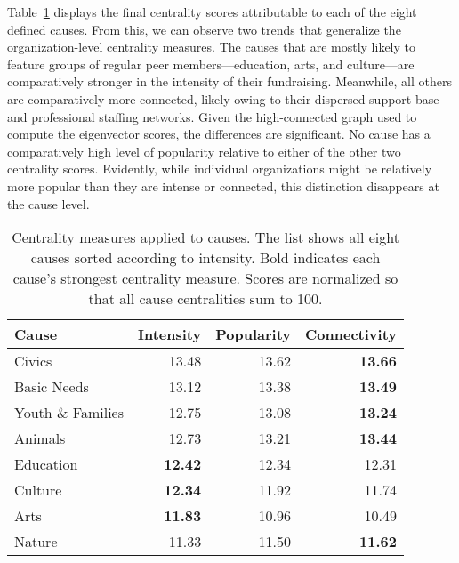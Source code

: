 Table~\ref{tab:cause} displays the final centrality scores attributable to each of the eight defined causes.
From this, we can observe two trends that generalize the organization-level centrality measures.
The causes that are mostly likely to feature groups of regular peer members---education, arts, and culture---are comparatively stronger in the intensity of their fundraising.
Meanwhile, all others are comparatively more connected, likely owing to their dispersed support base and professional staffing networks.
Given the high-connected graph used to compute the eigenvector scores, the differences are significant.
No cause has a comparatively high level of popularity relative to either of the other two centrality scores.
Evidently, while individual organizations might be relatively more popular than they are intense or connected, this distinction disappears at the cause level.

\begin{table}[H]
  \caption{Centrality measures applied to causes. The list shows all eight causes sorted according to intensity. Bold indicates each cause's strongest centrality measure. Scores are normalized so that all cause centralities sum to 100.}
  \label{tab:cause}
  \begin{tabular*}{\linewidth}{l@{\extracolsep{\fill}}rrr}
    \toprule
    Cause & Intensity & Popularity & Connectivity \\
    \midrule
    Civics & 13.48 & 13.62 & \textbf{13.66} \\
    Basic Needs & 13.12 & 13.38 & \textbf{13.49} \\
    Youth \& Families & 12.75 & 13.08 & \textbf{13.24} \\
    Animals & 12.73 & 13.21 & \textbf{13.44} \\
    Education & \textbf{12.42} & 12.34 & 12.31 \\
    Culture & \textbf{12.34} & 11.92 & 11.74 \\
    Arts & \textbf{11.83} & 10.96 & 10.49 \\
    Nature & 11.33 & 11.50 & \textbf{11.62} \\
    \bottomrule
  \end{tabular*}
\end{table}

